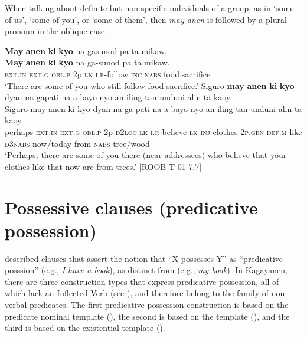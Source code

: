 When talking about definite but non-specific individuals of a group, as in ‘some of us’, ‘some of you’, or ‘some of them’, then \textit{may anen} is followed by a plural pronoun in the oblique case.
 
\ea
\textbf{May}  \textbf{anen}  \textbf{ki}  \textbf{kyo}  na  gasunod  pa  ta  mikaw. \\\smallskip \gll \textbf{May}  \textbf{anen}  \textbf{ki}  \textbf{kyo}  na  ga-sunod  pa  ta  mikaw. \\
\textsc{ext.in}  \textsc{ext.g}  \textsc{obl.p}  2p  \textsc{lk}  \textsc{i.r}-follow  \textsc{inc}  \textsc{nabs}  food.sacrifice \\
\glt ‘There are some of you who still follow food sacrifice.’
\z
\ea
Siguro \textbf{may} \textbf{anen} \textbf{ki} \textbf{kyo} dyan na gapati na a bayo nyo an iling tan unduni alin ta kaoy. \\\smallskip \gll Siguro  may  anen  ki  kyo  dyan  na  ga-pati  na  a  bayo  nyo  an iling  tan  unduni  alin  ta  kaoy. \\
perhaps  \textsc{ext.in}  \textsc{ext.g}  \textsc{obl.p}  2p  \textsc{d}2\textsc{loc}  \textsc{lk}  \textsc{i.r}-believe  \textsc{lk}  \textsc{inj}  clothes  2\textsc{p.gen}  \textsc{def.m}
like  \textsc{d}3\textsc{nabs}  now/today  from  \textsc{nabs}  tree/wood \\
\glt ‘Perhaps, there are some of you there (near addressees) who believe that your clothes like that now are from trees.’ [ROOB-T-01 7.7]
\z

\section{Possessive clauses (predicative possession)}
\label{sec:predicativepossession} 

\citet{stassen2009} described clauses that assert the notion that “X possesses Y” as “predicative posssion” (e.g., \textit{I have a book}), as distinct from  (e.g., \textit{my book}).  In Kagayanen, there are three construction types that express predicative possession, all of which lack an Inflected Verb (see ), and therefore belong to the family of non-verbal predicates. The first predicative possession construction is based on the predicate nominal template (), the second is based on the  template (), and the third is based on the existential template ().

